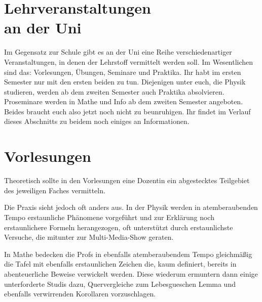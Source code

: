 \section[Lehrveranstaltungen an der Uni]{Lehrveranstaltungen \\an der Uni}

\begin{figure}[b]
\end{figure}

Im Gegensatz zur Schule gibt es an der Uni eine Reihe verschiedenartiger Veranstaltungen, in denen der Lehrstoff vermittelt werden soll. Im Wesentlichen sind das: Vorlesungen, Übungen, Seminare und Praktika. Ihr habt im ersten Semester nur mit den ersten beiden zu tun. Diejenigen unter euch, die Physik studieren, werden ab dem zweiten Semester auch Praktika absolvieren. Proseminare werden in Mathe und Info ab dem zweiten Semester angeboten. Beides braucht euch also jetzt noch nicht zu beunruhigen. Ihr findet im Verlauf dieses Abschnitts zu beidem noch einiges an Informationen.

\section{Vorlesungen}

Theoretisch sollte in den Vorlesungen eine Dozentin ein abgestecktes Teilgebiet des jeweiligen Faches vermitteln.

Die Praxis sieht jedoch oft anders aus. In der Physik werden in atemberaubenden Tempo erstaunliche Phänomene vorgeführt und zur Erklärung noch erstaunlichere Formeln herangezogen, oft unterstützt durch erstaunlichste Versuche, die mitunter zur Multi-Media-Show geraten.

In Mathe bedecken die Profs in ebenfalls atemberaubendem Tempo gleichmäßig die Tafel mit ebenfalls erstaunlichen Zeichen die, kaum definiert, bereits in abenteuerliche Beweise verwickelt werden. Diese wiederum ermuntern dann einige unterforderte Studis dazu, Quervergleiche zum Lebesgueschen Lemma und ebenfalls verwirrenden Korollaren vorzuschlagen.

